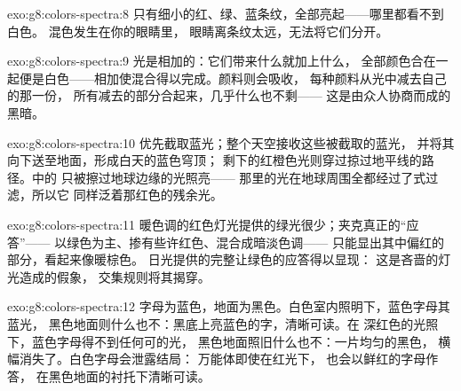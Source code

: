 \begin{solution}{exo:g8:colors-spectra:8}
只有细小的红、绿、蓝条纹，全部亮起——哪里都看不到白色。
混色发生在你的眼睛里，
眼睛离条纹太远，无法将它们分开。
\end{solution}

\begin{solution}{exo:g8:colors-spectra:9}
光是相加的：它们带来什么就加上什么，
全部颜色合在一起便是白色——相加使混合得以完成。颜料则会吸收，
每种颜料从光中减去自己的那一份，
所有减去的部分合起来，几乎什么也不剩——
这是由众人协商而成的黑暗。
\end{solution}

\begin{solution}{exo:g8:colors-spectra:10}
优先截取蓝光；整个天空接收这些被截取的蓝光，
并将其向下送至地面，形成白天的蓝色穹顶；
剩下的红橙色光则穿过掠过地平线的路径。中的
只被擦过地球边缘的光照亮——
那里的光在地球周围全都经过了式过滤，所以它
同样泛着那红色的残余光。
\end{solution}

\begin{solution}{exo:g8:colors-spectra:11}
暖色调的红色灯光提供的绿光很少；夹克真正的“应答”——
以绿色为主、掺有些许红色、混合成暗淡色调——
只能显出其中偏红的部分，看起来像暖棕色。
日光提供的完整让绿色的应答得以显现：
这是吝啬的灯光造成的假象，
交集规则将其揭穿。
\end{solution}

\begin{solution}{exo:g8:colors-spectra:12}
字母为蓝色，地面为黑色。白色室内照明下，蓝色字母其蓝光，
黑色地面则什么也不：黑底上亮蓝色的字，清晰可读。在
深红色的光照下，蓝色字母得不到任何可的光，
黑色地面照旧什么也不：一片均匀的黑色，
横幅消失了。白色字母会泄露结局：
万能体即使在红光下，
也会以鲜红的字母作答，
在黑色地面的衬托下清晰可读。
\end{solution}

